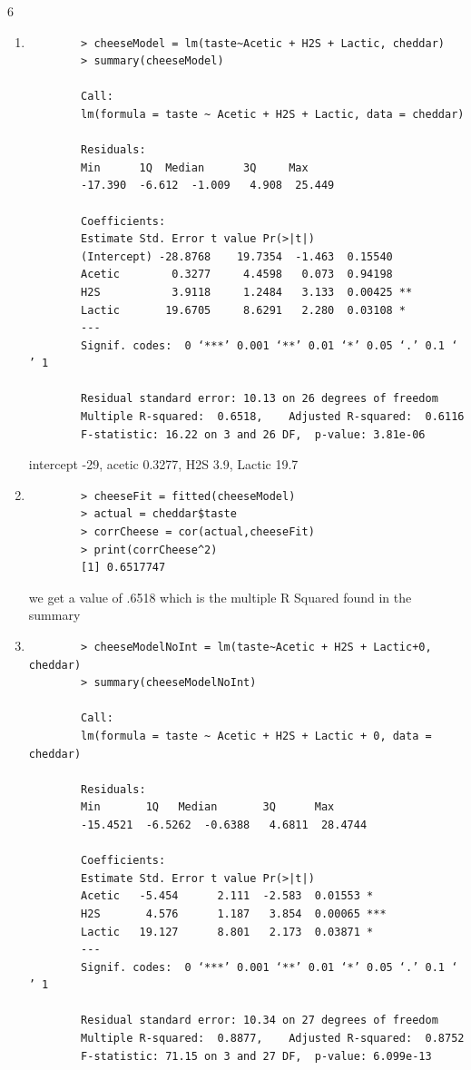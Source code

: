 \documentclass[11pt]{article}
\begin{document}
\begin{enumerate}
6
\begin{enumerate}
	\item 
	\begin{verbatim}
		> cheeseModel = lm(taste~Acetic + H2S + Lactic, cheddar)
		> summary(cheeseModel)
		
		Call:
		lm(formula = taste ~ Acetic + H2S + Lactic, data = cheddar)
		
		Residuals:
		Min      1Q  Median      3Q     Max 
		-17.390  -6.612  -1.009   4.908  25.449 
		
		Coefficients:
		Estimate Std. Error t value Pr(>|t|)   
		(Intercept) -28.8768    19.7354  -1.463  0.15540   
		Acetic        0.3277     4.4598   0.073  0.94198   
		H2S           3.9118     1.2484   3.133  0.00425 **
		Lactic       19.6705     8.6291   2.280  0.03108 * 
		---
		Signif. codes:  0 ‘***’ 0.001 ‘**’ 0.01 ‘*’ 0.05 ‘.’ 0.1 ‘ ’ 1
		
		Residual standard error: 10.13 on 26 degrees of freedom
		Multiple R-squared:  0.6518,	Adjusted R-squared:  0.6116 
		F-statistic: 16.22 on 3 and 26 DF,  p-value: 3.81e-06
	\end{verbatim}
	intercept -29, acetic 0.3277, H2S 3.9, Lactic 19.7
	\item 
	\begin{verbatim}
		> cheeseFit = fitted(cheeseModel)
		> actual = cheddar$taste
		> corrCheese = cor(actual,cheeseFit)
		> print(corrCheese^2)
		[1] 0.6517747
	\end{verbatim}
	we get a value of .6518 which is the multiple R Squared found in the summary
	\item
	\begin{verbatim}
		> cheeseModelNoInt = lm(taste~Acetic + H2S + Lactic+0, cheddar)
		> summary(cheeseModelNoInt)
		
		Call:
		lm(formula = taste ~ Acetic + H2S + Lactic + 0, data = cheddar)
		
		Residuals:
		Min       1Q   Median       3Q      Max 
		-15.4521  -6.5262  -0.6388   4.6811  28.4744 
		
		Coefficients:
		Estimate Std. Error t value Pr(>|t|)    
		Acetic   -5.454      2.111  -2.583  0.01553 *  
		H2S       4.576      1.187   3.854  0.00065 ***
		Lactic   19.127      8.801   2.173  0.03871 *  
		---
		Signif. codes:  0 ‘***’ 0.001 ‘**’ 0.01 ‘*’ 0.05 ‘.’ 0.1 ‘ ’ 1
		
		Residual standard error: 10.34 on 27 degrees of freedom
		Multiple R-squared:  0.8877,	Adjusted R-squared:  0.8752 
		F-statistic: 71.15 on 3 and 27 DF,  p-value: 6.099e-13
		

\end{verbatim}
\end{enumerate}
\end{enumerate}
\end{document}
